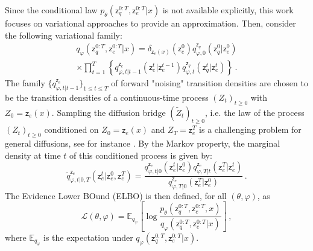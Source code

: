 \documentclass[nohyperref]{article}
\theoremstyle{plain}
\theoremstyle{definition}
\theoremstyle{remark}
\newcommand{\latentcont}{\mathsf{z}_e}
\newcommand{\latentdis}{\mathsf{z}_q}
\newcommand{\bckw}{\tilde{q}}
\begin{document}
Since the conditional law $p_{\theta}(\latentdis^{0:T},\latentcont^{0:T}| x)$ is not available explicitly, this work focuses on  variational approaches to provide an approximation. Then, consider the following variational family:
\begin{multline*}
q_{\varphi}(\latentdis^{0:T},\latentcont^{0:T}| x) = \delta_{\latentcont(x)}(\latentcont^0)q_{\varphi,0}^{\latentdis}(\latentdis^0|\latentcont^0)\\
\times\prod_{t=1}^T\left\{ q^{\latentcont}_{\varphi,t|t-1}(\latentcont^t|\latentcont^{t-1})q^{\latentdis}_{\varphi,t}(\latentdis^t|\latentcont^t)\right\}\,.
\end{multline*}
The family $\{q^{\latentcont}_{\varphi,t|t-1}\}_{1\leqslant t \leqslant T}$  of forward "noising" transition densities are chosen to be the transition densities of a continuous-time process $(Z_t)_{t\geqslant 0}$ with $Z_0 = \latentcont(x)$. Sampling the diffusion bridge $(\tilde Z_t)_{t\geqslant 0}$, i.e. the law of the process $(Z_t)_{t\geqslant 0}$  conditioned on $Z_0 = \latentcont(x)$ and $Z_T = \latentcont^T$ is a challenging problem for general diffusions, see for instance \cite{beskos2008mcmc,lin2010generating,bladt2016simulation}. By the Markov property, the  marginal density at time $t$ of this conditioned process is given by:
\begin{equation}
\label{eq:markov:bridge}
\bckw^{\latentcont}_{\varphi,t|0,T}(\latentcont^t|\latentcont^0,\latentcont^T) = \frac{q^{\latentcont}_{\varphi,t|0}(\latentcont^t|\latentcont^{0})q^{\latentcont}_{\varphi,T|t}(\latentcont^T|\latentcont^{t})}{q^{\latentcont}_{\varphi,T|0}(\latentcont^T|\latentcont^{0})}\,.
\end{equation}
The Evidence Lower BOund (ELBO) is then defined, for all $(\theta,\varphi)$, as
$$
\mathcal{L}(\theta,\varphi) = \mathbb{E}_{q_{\varphi}}\left[\log \frac{p_{\theta}(\latentdis^{0:T},\latentcont^{0:T},x)}{q_{\varphi}(\latentdis^{0:T},\latentcont^{0:T}| x)}\right]\,,
$$
where $\mathbb{E}_{q_{\varphi}}$ is the expectation under $q_{\varphi}(\latentdis^{0:T},\latentcont^{0:T}| x)$.
\end{document}

